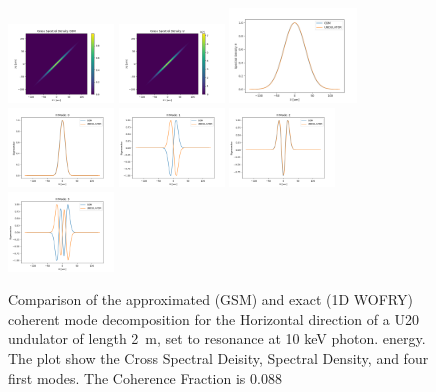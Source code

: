 \documentclass{iopconfser}
\begin{document}
\begin{figure}
    \centering
    \includegraphics[width=0.25\textwidth]{figures/comparison_H_CSD_GSM.png}
    \includegraphics[width=0.25\textwidth]{figures/comparison_H_CSD_U.png}
    \newline
    \includegraphics[width=0.3\textwidth]{figures/comparison_H_SD.png}
    \newline
    \includegraphics[width=0.25\textwidth]{figures/comparison_H_eigenvector0.png}
    \includegraphics[width=0.25\textwidth]{figures/comparison_H_eigenvector1.png}
    \includegraphics[width=0.25\textwidth]{figures/comparison_H_eigenvector2.png}
    \includegraphics[width=0.25\textwidth]{figures/comparison_H_eigenvector3.png}
        
    \caption{Comparison of the approximated (GSM) and exact (1D WOFRY) coherent mode decomposition  for the Horizontal direction of a U20 undulator of length \SI{2}{\meter},  set to resonance at 10 keV photon. energy. The plot show the Cross Spectral Deisity, Spectral Density, and four first modes. The Coherence Fraction is 0.088}
    \label{fig:GSMvsUND-H}
\end{figure}
\end{document}
